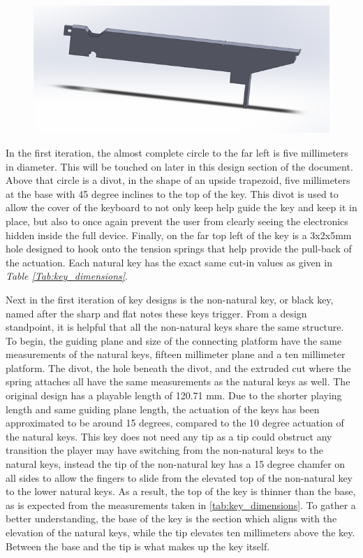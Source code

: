 \begin{figure}[h!]
  \centering
  \includegraphics[width=0.8\linewidth]{image/WhiteModel2.png}
  \caption{}
  \label{fig:white_model2}
\end{figure}

In the first iteration, the almost complete circle to the far left is five millimeters in diameter. This will be touched on later in this design section of the document. Above that circle is a divot, in the shape of an upside trapezoid, five millimeters at the base with 45 degree inclines to the top of the key. This divot is used to allow the cover of the keyboard to not only keep help guide the key and keep it in place, but also to once again prevent the user from clearly seeing the electronics hidden inside the full device. Finally, on the far top left of the key is a 3x2x5mm hole designed to hook onto the tension springs that help provide the pull-back of the actuation. Each natural key has the exact same cut-in values as given in \textit{Table \ref{Tab:key_dimensions}}.

Next in the first iteration of key designs is the non-natural key, or black key, named after the sharp and flat notes these keys trigger. From a design standpoint, it is helpful that all the non-natural keys share the same structure. To begin, the guiding plane and size of the connecting platform have the same measurements of the natural keys, fifteen millimeter plane and a ten millimeter platform. The divot, the hole beneath the divot, and the extruded cut where the spring attaches all have the same measurements as the natural keys as well. The original design has a playable length of 120.71 mm. Due to the shorter playing length and same guiding plane length, the actuation of the keys has been approximated to be around 15 degrees, compared to the 10 degree actuation of the natural keys. This key does not need any tip as a tip could obstruct any transition the player may have switching from the non-natural keys to the natural keys, instead the tip of the non-natural key has a 15 degree chamfer on all sides to allow the fingers to slide from the elevated top of the non-natural key to the lower natural keys. As a result, the top of the key is thinner than the base, as is expected from the measurements taken in \autoref{tab:key_dimensions}. To gather a better understanding, the base of the key is the section which aligns with the elevation of the natural keys, while the tip elevates ten millimeters above the key. Between the base and the tip is what makes up the key itself.

